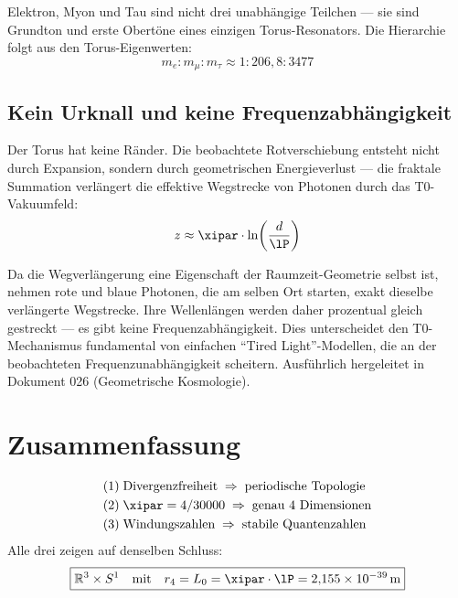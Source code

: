 Elektron, Myon und Tau sind nicht drei unabhängige Teilchen — sie sind Grundton und erste Obertöne eines einzigen Torus-Resonators. Die Hierarchie folgt aus den Torus-Eigenwerten:
\begin{equation}
	m_e : m_\mu : m_\tau \approx 1 : 206{,}8 : 3477
\end{equation}

\subsection{Kein Urknall und keine Frequenzabhängigkeit}

Der Torus hat keine Ränder. Die beobachtete Rotverschiebung entsteht nicht durch Expansion, sondern durch geometrischen Energieverlust — die fraktale Summation verlängert die effektive Wegstrecke von Photonen durch das T0-Vakuumfeld:
\begin{equation}
	z \approx \xipar \cdot \ln\!\left(\frac{d}{\lP}\right)
\end{equation}

\begin{keypoint}
Da die Wegverlängerung eine Eigenschaft der Raumzeit-Geometrie selbst ist, nehmen rote und blaue Photonen, die am selben Ort starten, exakt dieselbe verlängerte Wegstrecke. Ihre Wellenlängen werden daher prozentual gleich gestreckt — es gibt keine Frequenzabhängigkeit. Dies unterscheidet den T0-Mechanismus fundamental von einfachen ``Tired Light''-Modellen, die an der beobachteten Frequenzunabhängigkeit scheitern. Ausführlich hergeleitet in Dokument 026 (Geometrische Kosmologie).
\end{keypoint}

\section{Zusammenfassung}

\begin{keyresult}
\begin{align}
	(1)\; & \text{Divergenzfreiheit} \;\Rightarrow\; \text{periodische Topologie} \notag \\
	(2)\; & \xipar = 4/30000 \;\Rightarrow\; \text{genau 4 Dimensionen} \notag \\
	(3)\; & \text{Windungszahlen} \;\Rightarrow\; \text{stabile Quantenzahlen} \notag
\end{align}
Alle drei zeigen auf denselben Schluss:
\begin{equation}
	\boxed{\mathbb{R}^3 \times S^1 \quad \text{mit} \quad r_4 = L_0 = \xipar \cdot \lP = 2{,}155 \times 10^{-39}\,\text{m}}
\end{equation}
\end{keyresult}


